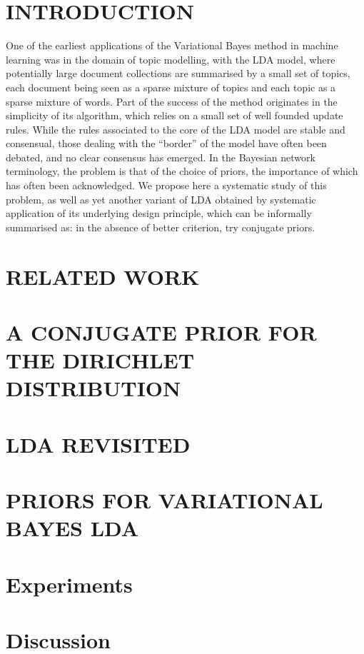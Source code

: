 \documentclass[twoside]{article}
\begin{document}
\section{INTRODUCTION}
One of the earliest applications of the Variational Bayes method in machine learning was in the domain of topic modelling, with the LDA model, where potentially large document collections are summarised by a small set of topics, each document being seen as a sparse mixture of topics and each topic as a sparse mixture of words. Part of the success of the method originates in the simplicity of its algorithm, which relies on a small set of well founded update rules. While the rules associated to the core of the LDA model are stable and consensual, those dealing with the ``border'' of the model have often been debated, and no clear consensus has emerged. In the Bayesian network terminology, the problem is that of the choice of priors, the importance of which has often been acknowledged. We propose here a systematic study of this problem, as well as yet another variant of LDA obtained by systematic application of its underlying design principle, which can be informally summarised as: in the absence of better criterion, try conjugate priors.
\section{RELATED WORK}

\section{A CONJUGATE PRIOR FOR THE DIRICHLET DISTRIBUTION}
\label{sec:huntingsnark}

\section{LDA REVISITED}
\label{sec:ldarevisited}

\section{PRIORS FOR VARIATIONAL BAYES LDA}
\label{sec:ldawithcprior}



\section{Experiments}
\section{Discussion}





\end{document}
